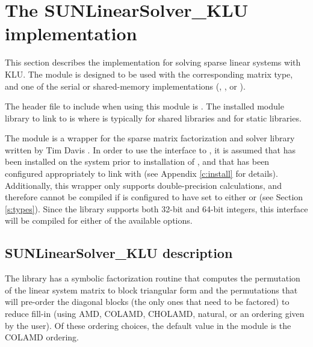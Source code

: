 \section{The SUNLinearSolver\_KLU implementation}
\label{ss:sunlinsol_klu}

This section describes the {\sunlinsol} implementation for solving sparse linear
systems with KLU. The {\sunlinsolklu} module is designed to be used with the
corresponding {\sunmatsparse} matrix type, and one of the serial or
shared-memory {\nvector} implementations ({\nvecs}, {\nvecopenmp}, or
{\nvecpthreads}).

The header file to include when using this module
is . The installed module
library to link to is
where  is typically  for shared libraries and
 for static libraries.

The {\sunlinsolklu} module is a {\sunlinsol} wrapper for
the {\klu} sparse matrix factorization and solver library written by Tim
Davis \cite{KLU_site,DaPa:10}.  In order to use the
{\sunlinsolklu} interface to {\klu}, it is assumed that {\klu} has
been installed on the system prior to installation of {\sundials}, and
that {\sundials} has been configured appropriately to link with {\klu}
(see Appendix \ref{c:install} for details).  Additionally, this
wrapper only supports double-precision calculations, and therefore
cannot be compiled if {\sundials} is configured to have 
set to either  or  (see Section \ref{s:types}).
Since the {\klu} library supports both 32-bit and 64-bit integers, this
interface will be compiled for either of the available 
options. {\warn}

\subsection{SUNLinearSolver\_KLU description}
\label{ss:sunlinsol_klu_description}

The {\klu} library has a symbolic factorization routine that computes
the permutation of the linear system matrix to block triangular form
and the permutations that will pre-order the diagonal blocks (the only
ones that need to be factored) to reduce fill-in (using AMD, COLAMD,
CHOLAMD, natural, or an ordering given by the user).  Of these
ordering choices, the default value in the {\sunlinsolklu}
module is the COLAMD ordering.

